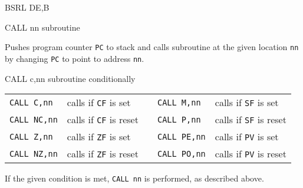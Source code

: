 \begin{basedescript}{
	\desclabelstyle{\multilinelabel}
	\desclabelwidth{3cm}}
\begin{DetailItem}{BSRL DE,B\ZXN}
		\begin{DetailEffects}
			\FlagsBSRL
		\end{DetailEffects}
		
		\begin{DetailTiming}
			\DetailTime{2}{8}
		\end{DetailTiming}

	\end{DetailItem}
	
	\pagebreak
	\begin{DetailItem}{CALL nn}
		{ subroutine}
		{\SymCALL{nn}}

		Pushes program counter {\tt PC} to stack and calls subroutine at the given location {\tt nn} by changing {\tt PC} to point to address {\tt nn}.

		\begin{DetailEffects}
			\FlagsCALLnn
		\end{DetailEffects}
		
		\begin{DetailTiming}
			\DetailTime{5}{17}
		\end{DetailTiming}

	\end{DetailItem}

	\begin{DetailItem}{CALL c,nn}
		{ subroutine conditionally}
		{\SymCALLc{nn}}

		\vspace{1ex} %
		\begin{tabular}{@{}llcll}			
			{\tt CALL C,nn} & calls if {\tt CF} is set & &
				{\tt CALL M,nn} & calls if {\tt SF} is set\\
			{\tt CALL NC,nn} & calls if {\tt CF} is reset & &
				{\tt CALL P,nn} & calls if {\tt SF} is reset\\
			{\tt CALL Z,nn} & calls if {\tt ZF} is set & &
				{\tt CALL PE,nn} & calls if {\tt PV} is set\\
			{\tt CALL NZ,nn} & calls if {\tt ZF} is reset & &
				{\tt CALL PO,nn} & calls if {\tt PV} is reset\\
		\end{tabular}

		If the given condition is met, {\tt CALL nn} is performed, as described above.

		\begin{DetailEffects}
			\FlagsCALLccnn
		\end{DetailEffects}


\end{DetailItem}
\end{basedescript}
